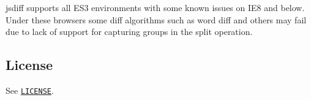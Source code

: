 \href{https://saucelabs.com/u/jsdiff}{\tt }

jsdiff supports all E\+S3 environments with some known issues on I\+E8 and below. Under these browsers some diff algorithms such as word diff and others may fail due to lack of support for capturing groups in the {\ttfamily split} operation.

\subsection*{License}

See \href{https://github.com/kpdecker/jsdiff/blob/master/LICENSE}{\tt L\+I\+C\+E\+N\+SE}. 